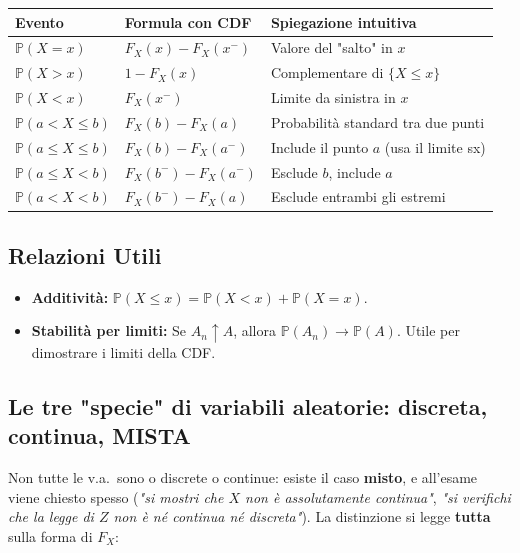 \documentclass[12pt]{extarticle} %
\begin{document}
\begin{center}
\renewcommand{\arraystretch}{1.5}
\begin{tabular}{|l|l|l|}
\hline
\textbf{Evento} & \textbf{Formula con CDF} & \textbf{Spiegazione intuitiva} \\ \hline
$\mathbb{P}(X = x)$ & $F_X(x) - F_X(x^-)$ & Valore del "salto" in $x$ \\ \hline
$\mathbb{P}(X > x)$ & $1 - F_X(x)$ & Complementare di $\{X \le x\}$ \\ \hline
$\mathbb{P}(X < x)$ & $F_X(x^-)$ & Limite da sinistra in $x$ \\ \hline
$\mathbb{P}(a < X \le b)$ & $F_X(b) - F_X(a)$ & Probabilità standard tra due punti \\ \hline
$\mathbb{P}(a \le X \le b)$ & $F_X(b) - F_X(a^-)$ & Include il punto $a$ (usa il limite sx) \\ \hline
$\mathbb{P}(a \le X < b)$ & $F_X(b^-) - F_X(a^-)$ & Esclude $b$, include $a$ \\ \hline
$\mathbb{P}(a < X < b)$ & $F_X(b^-) - F_X(a)$ & Esclude entrambi gli estremi \\ \hline
\end{tabular}
\end{center}

\subsection{Relazioni Utili}
\begin{itemize}
    \item \textbf{Additività:} $\mathbb{P}(X \le x) = \mathbb{P}(X < x) + \mathbb{P}(X = x)$.
    \item \textbf{Stabilità per limiti:} Se $A_n \uparrow A$, allora $\mathbb{P}(A_n) \to \mathbb{P}(A)$. Utile per dimostrare i limiti della CDF.
\end{itemize}

\newpage
\subsection{Le tre "specie" di variabili aleatorie: discreta, continua, MISTA}
Non tutte le v.a.\ sono o discrete o continue: esiste il caso \textbf{misto}, e all'esame viene chiesto spesso (\emph{"si mostri che $X$ non è assolutamente continua"}, \emph{"si verifichi che la legge di $Z$ non è né continua né discreta"}). La distinzione si legge \textbf{tutta} sulla forma di $F_X$:
\end{document}
